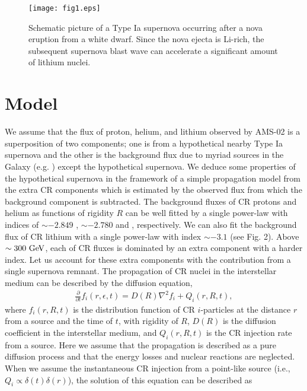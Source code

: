 \documentclass[twocolumn,showpacs,amsmath,amssymb]{revtex4-1}
\begin{document}
\begin{figure}[tbp]
\begin{center}
\texttt{[image: fig1.eps]} 
\caption{Schematic picture of a Type Ia supernova occurring after a nova eruption from a white dwarf.  Since the nova ejecta is Li-rich, the subsequent supernova blast wave can accelerate a significant amount of lithium nuclei.}
\label{fig1}
\end{center}
\end{figure}

\section{Model}
We assume that the flux of proton, helium, and lithium observed by AMS-02 is a superposition of two components; one is from a hypothetical nearby Type Ia supernova and the other is the background flux due to myriad sources in the Galaxy (e.g. \cite{2003ApJ...582..330H}) except the hypothetical supernova.  We deduce some properties of the hypothetical supernova in the framework of a simple propagation model from the extra CR components which is estimated by the observed flux from which the background component is subtracted.  The background fluxes of CR protons and helium as functions of rigidity $R$ can be well fitted by a single power-law with indices of $\sim -2.849$ \cite{2015PhRvL.114q1103A}, $\sim -2.780$ and \cite{2015PhRvL.115u1101A}, respectively.  We can also fit the background flux of CR lithium with a single power-law with index $\sim -3.1$ (see Fig. 2).  Above $\sim 300~{\rm GeV}$, each of CR fluxes is dominated by an extra component with a harder index.  Let us account for these extra components with the contribution from a single supernova remnant.  The propagation of CR nuclei in the interstellar medium can be described by the diffusion equation,
\begin{eqnarray}
\frac{\partial }{\partial t}f_i(r, \epsilon, t)=D(R)\nabla^2 f_i +Q_i(r,R,t),
\end{eqnarray}
where  $f_i(r,R,t)$ is the distribution function of CR $i$-particles at the distance $r$ from a source and the time of $t$, with rigidity of $R$, $D(R)$ is the diffusion coefficient in the interstellar medium, and $Q_i(r,R,t)$ is the CR injection rate from a source.  Here we assume that the propagation is described as a pure diffusion process and that the energy losses and nuclear reactions are neglected.  When we assume the instantaneous CR injection from a point-like source (i.e., $Q_i \propto \delta(t) \delta (r)$), the solution of this equation can be described as
\end{document}

